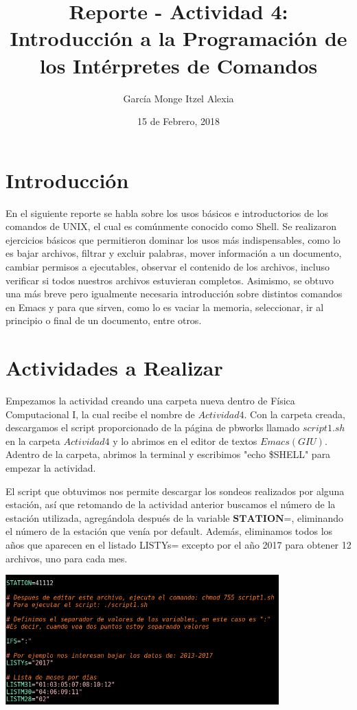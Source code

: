 \documentclass{article}
\title{Reporte - Actividad 4: Introducción a la Programación de los Intérpretes de Comandos}
\author{García Monge Itzel Alexia}
\date{15 de Febrero, 2018}
\begin{document}
\maketitle
\section{Introducción}
En el siguiente reporte se habla sobre los usos básicos e introductorios de los comandos de UNIX, el cual es comúnmente conocido como Shell. Se realizaron ejercicios básicos que permitieron dominar los usos más indispensables, como lo es bajar archivos, filtrar y excluir palabras, mover información a un documento, cambiar permisos a ejecutables, observar el contenido de los archivos, incluso verificar si todos nuestros archivos estuvieran completos. Asimismo, se obtuvo una más breve pero igualmente necesaria introducción sobre distintos comandos en Emacs y para que sirven, como lo es vaciar la memoria, seleccionar, ir al principio o final de un documento, entre otros.

\section{Actividades a Realizar}
Empezamos la actividad creando una carpeta nueva dentro de Física Computacional I, la cual recibe el nombre de $Actividad4$. Con la carpeta creada, descargamos el script proporcionado de la página de pbworks llamado $script1.sh$ en la carpeta $Actividad4$ y lo abrimos en el editor de textos $Emacs (GIU)$. Adentro de la carpeta, abrimos la terminal y escribimos "echo \$SHELL" para empezar la actividad. 

El script que obtuvimos nos permite descargar los sondeos realizados por alguna estación, así que retomando de la actividad anterior buscamos el número de la estación utilizada, agregándola después de la variable $\textbf{STATION=}$, eliminando el  número de la estación que venía por default. Además, eliminamos todos los años que aparecen en el listado LISTYs= excepto por el año 2017 para obtener 12 archivos, uno para cada mes.  

    \begin{center}
    \includegraphics[height=5cm]{STATION.png}
    \end{center}
\end{document}

